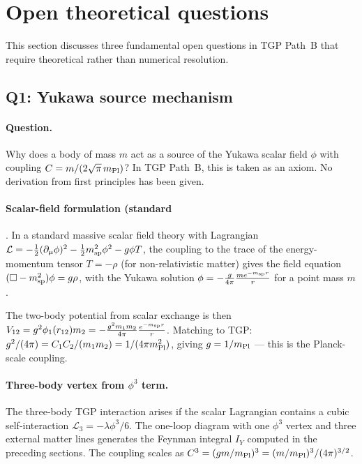 \section{Open theoretical questions}
\label{sec:open_questions}

This section discusses three fundamental open questions in TGP Path~B
that require theoretical rather than numerical resolution.

\subsection{Q1: Yukawa source mechanism}
\label{sec:yukawa_source}

\paragraph{Question.}
Why does a body of mass $m$ act as a source of the Yukawa scalar field
$\phi$ with coupling $C = m/(2\sqrt{\pi}\,m_{\rm Pl})$?
In TGP Path~B, this is taken as an axiom.  No derivation from first
principles has been given.

\paragraph{Scalar-field formulation (standard}.
In a standard massive scalar field theory with Lagrangian
$\mathcal{L} = -\frac{1}{2}(\partial_\mu\phi)^2 - \frac{1}{2}m_{\rm sp}^2\phi^2 - g\phi T$,
the coupling to the trace of the energy-momentum tensor $T=-\rho$ (for
non-relativistic matter) gives the field equation
$(\Box - m_{\rm sp}^2)\phi = g\rho$,
with the Yukawa solution $\phi = -\frac{g}{4\pi}\frac{m e^{-m_{\rm sp}r}}{r}$
for a point mass $m$.

The two-body potential from scalar exchange is then
$V_{12} = g^2\phi_1(r_{12})m_2 = -\frac{g^2 m_1 m_2}{4\pi}\frac{e^{-m_{\rm sp}r}}{r}$.
Matching to TGP: $g^2/(4\pi) = C_1 C_2 / (m_1 m_2) = 1/(4\pi m_{\rm Pl}^2)$,
giving $g = 1/m_{\rm Pl}$ — this is the Planck-scale coupling.

\paragraph{Three-body vertex from $\phi^3$ term.}
The three-body TGP interaction arises if the scalar Lagrangian contains
a cubic self-interaction $\mathcal{L}_3 = -\lambda\phi^3/6$.  The one-loop
diagram with one $\phi^3$ vertex and three external matter lines generates
the Feynman integral $I_Y$ computed in the preceding sections.  The
coupling scales as $C^3 = (g m/m_{\rm Pl})^3 = (m/m_{\rm Pl})^3/(4\pi)^{3/2}$.

